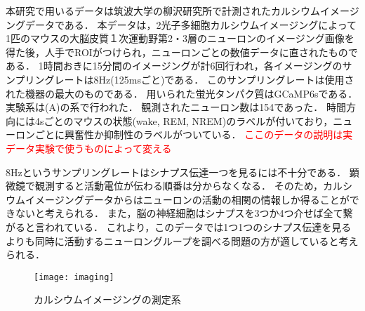 本研究で用いるデータは筑波大学の柳沢研究所で計測されたカルシウムイメージングデータである．
本データは，2光子多細胞カルシウムイメージングによって1匹のマウスの大脳皮質１次運動野第2・3層のニューロンのイメージング画像を得た後，人手でROIがつけられ，ニューロンごとの数値データに直されたものである．
1時間おきに15分間のイメージングが計6回行われ，各イメージングのサンプリングレートは8Hz(125msごと)である．
このサンプリングレートは使用された機器の最大のものである．
用いられた蛍光タンパク質はGCaMP6sである．
実験系は(A)の系で行われた\cite{Kanda2016}．
観測されたニューロン数は154であった．
時間方向には4sごとのマウスの状態(wake, REM, NREM)のラベルが付いており，ニューロンごとに興奮性か抑制性のラベルがついている．
\textcolor{red}{ここのデータの説明は実データ実験で使うものによって変える}

8Hzというサンプリングレートはシナプス伝達一つを見るには不十分である．
顕微鏡で観測すると活動電位が伝わる順番は分からなくなる．
そのため，カルシウムイメージングデータからはニューロンの活動の相関の情報しか得ることができないと考えられる．
また，脳の神経細胞はシナプスを3つか4つ介せば全て繋がると言われている．
これより，このデータでは1つ1つのシナプス伝達を見るよりも同時に活動するニューロングループを調べる問題の方が適していると考えられる．
\begin{figure}[htbp]
    \begin{center}
				\texttt{[image: imaging]}
        \caption{カルシウムイメージングの測定系}
        \label{fig:imaging}
    \end{center}
\end{figure}
